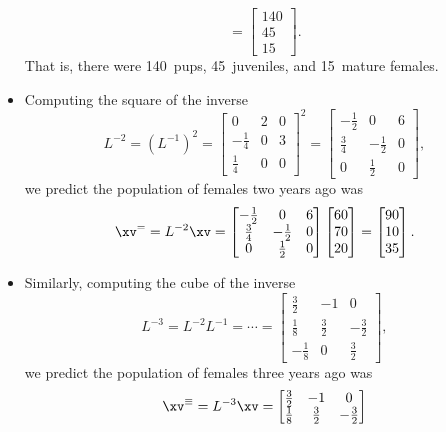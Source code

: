 \begin{example}
\begin{solution}
\begin{itemize}
\begin{equation*}
=\begin{bmatrix} 140\\45\\15 \end{bmatrix}.
\end{equation*}
That is, there were 140~pups, 45~juveniles, and 15~mature females.
\item Computing the square of the inverse
\begin{equation*}
L^{-2}=(L^{-1})^2
=\begin{bmatrix} 0&2&0\\-\frac14&0&3\\\frac14&0&0 \end{bmatrix}^2
=\begin{bmatrix} -\frac12&0&6\\
\frac34&-\frac12&0\\
0&\frac12&0 \end{bmatrix},
\end{equation*}
we predict the population of females two years ago was
\begin{equation*}
\xv^==L^{-2}\xv
=\begin{bmatrix} -\frac12&0&6\\
\frac34&-\frac12&0\\
0&\frac12&0 \end{bmatrix}
\begin{bmatrix} 60\\70\\20 \end{bmatrix}
=\begin{bmatrix} 90\\10\\35 \end{bmatrix}.
\end{equation*}
\item Similarly, computing the cube of the inverse
\begin{equation*}
L^{-3}=L^{-2}L^{-1}=\cdots
=\begin{bmatrix} \frac32&-1&0\\
\frac18&\frac32&-\frac32\\
-\frac18&0&\frac32 \end{bmatrix},
\end{equation*}
we predict the population of females three years ago was
\begin{equation*}
\xv^\equiv=L^{-3}\xv
=\begin{bmatrix} \frac32&-1&0\\
\frac18&\frac32&-\frac32\\

\end{bmatrix}
\end{equation*}
\end{itemize}
\end{solution}
\end{example}
